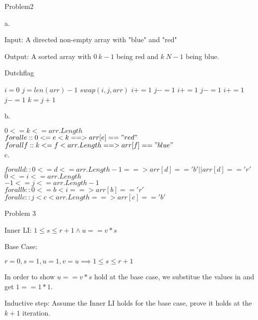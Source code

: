 \documentclass[12pt]{article}
\begin{document}
	\newpage
\noindent Problem2

	a.
	
	Input: A directed non-empty array with "blue" and "red"
	
	Output: A sorted array with $0~k-1$ being red and $k~N-1$ being blue.
	\begin{algorithm}
		\caption{Dutchflag}\label{dutchflag}
		\begin{algorithmic}[1]
			\State $i = 0$
			\State $j = len(arr) - 1$
			\State $swap(i,j,arr)$
			\State $i += 1$
			\State $j -= 1$
			\EndIf
			\State $i += 1$
			\State $j -= 1$
			\EndIf
			\State $i += 1$
			\EndIf
			\State $j -= 1$
			\EndIf
			\EndWhile
			\State $k = j+1$
			\EndProcedure
		\end{algorithmic}
	\end{algorithm}
	
	b.
	
	\noindent $0<=k<=arr.Length$\\
	$forall e:: 0<=e<k ==> arr[e] == "red"$\\
	$forall f:: k<=f<arr.Length ==> arr[f] == "blue"$\\
	
	c.
	
	\noindent $forall d:: 0<=d<=arr.Length-1 ==> arr[d] == 'b' || arr[d] == 'r'$\\
	$0<=i<=arr.Length$\\
	$-1<=j<=arr.Length-1$\\
	$forall b:: 0<=b<i ==> arr[b] == 'r'$\\ 
	$forall c:: j<c<arr.Length ==> arr[c] == 'b'$\\
	
	\newpage
	
	\noindent Problem 3
	
	Inner LI: $1 \leq s \leq r+1 \land u == v * s$
	
	Base Case:
	
	$r = 0 ,s = 1, u = 1, v = u \implies 1 \leq s \leq r+1$
	
	In order to show $u == v * s$ hold at the base case, we substitue the values in and get $1 == 1 * 1$.
	
	Inductive step: Assume the Inner LI holds for the base case, prove it holds at the $k+1$ iteration.
	
\end{document}

